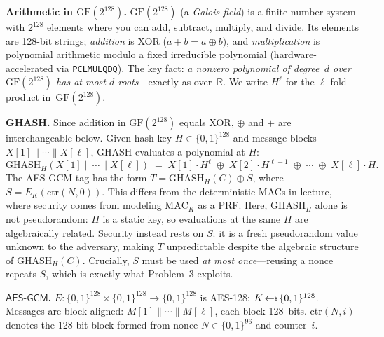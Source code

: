 \documentclass[11pt]{article}
\newcommand{\getsr}{{{\,\leftarrow{\hspace*{-3pt}\raisebox{.75pt}{$\scriptscriptstyle\$$}}\,}}}
\newcommand{\bits}{\{0,1\}}
\newcommand{\GF}{\mathrm{GF}(2^{128})}
\newcommand{\GHASH}{\mathrm{GHASH}}
\newcommand{\AESGCM}{\mathsf{AES\text{-}GCM}}
\newcommand{\ctr}{\mathrm{ctr}}
\begin{document}
\bigskip

\noindent\textbf{Arithmetic in $\GF$.}\quad
$\GF$ (a \emph{Galois field}) is a finite number system with
$2^{128}$ elements where you can add, subtract, multiply, and divide.
Its elements are 128-bit strings; \emph{addition} is XOR
($a + b = a \oplus b$), and \emph{multiplication} is polynomial
arithmetic modulo a fixed irreducible polynomial
(hardware-accelerated via \texttt{PCLMULQDQ}).
The key fact: \emph{a nonzero polynomial of degree~$d$ over $\GF$
has at most $d$ roots}---exactly as over~$\mathbb{R}$.
We write $H^\ell$ for the $\ell$-fold product in~$\GF$.

\bigskip

\noindent\textbf{GHASH.}\quad
Since addition in $\GF$ equals XOR, $\oplus$ and $+$ are
interchangeable below.
Given hash key $H \in \bits^{128}$ and message blocks
$X[1]\|\cdots\|X[\ell]$, GHASH evaluates a polynomial at $H$:
\[
  \GHASH_H(X[1]\|\cdots\|X[\ell])
  \;=\;
  X[1] \cdot H^{\ell}
  \;\oplus\;
  X[2] \cdot H^{\ell-1}
  \;\oplus\;
  \cdots
  \;\oplus\;
  X[\ell] \cdot H.
\]
The AES-GCM tag has the form $T = \GHASH_H(C) \oplus S$,
where $S = E_K(\ctr(N,0))$.
This differs from the deterministic MACs in lecture, where security
comes from modeling $\mathrm{MAC}_K$ as a PRF\@.
Here, $\GHASH_H$ alone is not pseudorandom: $H$ is a static key, so
evaluations at the same $H$ are algebraically related.
Security instead rests on $S$: it is a fresh pseudorandom value
unknown to the adversary, making $T$ unpredictable despite the
algebraic structure of $\GHASH_H(C)$.
Crucially, $S$ must be used \emph{at most once}---reusing a nonce
repeats $S$, which is exactly what Problem~3 exploits.

\bigskip

\noindent\textbf{$\AESGCM$.}\quad
$E \colon \bits^{128} \times \bits^{128} \to \bits^{128}$ is AES-128;
$K \getsr \bits^{128}$.
Messages are block-aligned: $M[1]\|\cdots\|M[\ell]$, each block 128~bits.
$\ctr(N, i)$ denotes the 128-bit block formed from nonce $N \in \bits^{96}$
and counter~$i$.
\end{document}
